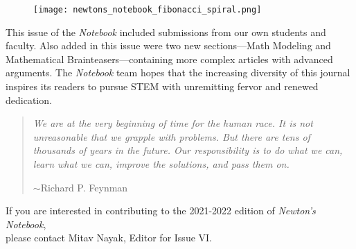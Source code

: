 \documentclass[12pt]{article}
\theoremstyle{definition}
\begin{document}
\newpage


\begin{figure}[H]
    \centering
    \vspace*{50pt}
    \texttt{[image: newtons\_notebook\_fibonacci\_spiral.png]}
    \vspace*{25pt}
\end{figure}

    This issue of the \textit{Notebook} included submissions from our own students and faculty. Also added in this issue were two new sections—Math Modeling and Mathematical Brainteasers—containing more complex articles with advanced arguments. The \textit{Notebook} team hopes that the increasing diversity of this journal inspires its readers to pursue STEM with unremitting fervor and renewed dedication. 

\begin{quotation}
\textit{We are at the very beginning of time for the human race. It is not unreasonable that we grapple with problems. But there are tens of thousands of years in the future. Our responsibility is to do what we can, learn what we can, improve the solutions, and pass them on.}
	\begin{flushright}
$\sim$Richard P. Feynman
	\end{flushright}
\end{quotation}

\begin{center}
If you are interested in contributing to the 2021-2022 edition of \textit{Newton’s Notebook},\\ 
please contact Mitav Nayak, Editor for Issue VI.
\end{center}

\end{document}

